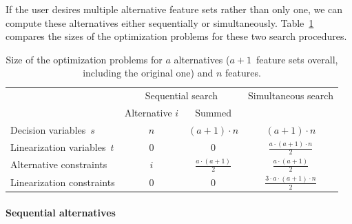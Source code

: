 \documentclass{article}
\theoremstyle{definition}
\begin{document}
If the user desires multiple alternative feature sets rather than only one, we can compute these alternatives either sequentially or simultaneously.
Table~\ref{tab:seq-sim-comparison} compares the sizes of the optimization problems for these two search procedures.
%
\begin{table}[htb]
	\centering
	\renewcommand*{\arraystretch}{1.3}
	\begin{tabular}{lccc}
		\toprule
		& \multicolumn{2}{c}{Sequential search} & Simultaneous search \\
		\cmidrule(r){2-3}
		& Alternative $i$ & Summed & \\
		\midrule
		Decision variables~$s$ & $n$ & $ (a+1) \cdot n$ & $(a+1) \cdot n$ \\
		Linearization variables~$t$ & $0$ & $0$ & $\frac{a \cdot (a+1) \cdot n}{2}$ \\
		Alternative constraints & $i$ & $\frac{a \cdot (a+1)}{2}$ & $\frac{a \cdot (a+1)}{2}$ \\
		Linearization constraints & $0$ & $0$ & $\frac{3 \cdot a \cdot (a+1) \cdot n}{2}$ \\
		\bottomrule
	\end{tabular}
	\caption{Size of the optimization problems for $a$ alternatives ($a + 1$~feature sets overall, including the original one) and $n$ features.}
	\label{tab:seq-sim-comparison}
\end{table}
%
\paragraph{Sequential alternatives}
\end{document}
